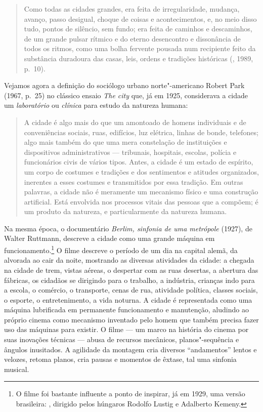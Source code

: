 \begin{quote}
Como todas as cidades grandes, era feita de irregularidade, mudança,
avanço, passo desigual, choque de coisas e acontecimentos, e, no meio
disso tudo, pontos de silêncio, sem fundo; era feita de caminhos e
descaminhos, de um grande pulsar rítmico e do eterno desencontro e
dissonância de todos os ritmos, como uma bolha fervente pousada num
recipiente feito da substância duradoura das casas, leis, ordens e
tradições históricas (, 1989, p.~10).
\end{quote}

Vejamos agora a definição do sociólogo urbano norte"-americano Robert
Park (1967, p.~25) no clássico ensaio \emph{The city} que, já em 1925,
considerava a cidade um \emph{laboratório} ou \emph{clínica} para estudo
da natureza humana:

\begin{quote}
A cidade é algo mais do que um amontoado de homens individuais e de
conveniências sociais, ruas, edifícios, luz elétrica, linhas de bonde,
telefones; algo mais também do que uma mera constelação de
instituições e dispositivos administrativos --- tribunais, hospitais,
escolas, polícia e funcionários civis de vários tipos. Antes, a cidade é
um estado de espírito, um corpo de costumes e tradições e dos
sentimentos e atitudes organizados, inerentes a esses costumes e
transmitidos por essa tradição. Em outras palavras, a cidade não é
meramente um mecanismo físico e uma construção artificial. Está
envolvida nos processos vitais das pessoas que a compõem; é um produto
da natureza, e particularmente da natureza humana.
\end{quote}

Na mesma época, o documentário \emph{Berlim, sinfonia de uma
metrópole} (1927), de Walter Ruttmann, descreve a cidade como uma grande
máquina em funcionamento.\footnote{O filme foi bastante influente a
  ponto de inspirar, já em 1929, uma versão brasileira: {}, dirigido pelos húngaros Rodolfo Lustig e
  Adalberto Kemeny.} O filme descreve o período de um dia na capital
alemã, da alvorada ao cair da noite, mostrando as diversas atividades da
cidade: a chegada na cidade de trem, vistas aéreas, o despertar com as
ruas desertas, a abertura das fábricas, os cidadãos se dirigindo para o
trabalho, a indústria, crianças indo para a escola, o comércio, o
transporte, cenas de rua, atividade política, classes sociais, o
esporte, o entretenimento, a vida noturna. A cidade é representada como
uma máquina lubrificada em permanente funcionamento e manutenção,
aludindo ao próprio cinema como mecanismo inventado pelo homem que
também precisa fazer uso das máquinas para existir. O filme --- um marco
na história do cinema por suas inovações técnicas --- abusa de recursos
mecânicos, planos"-sequência e ângulos inusitados. A agilidade da
montagem cria diversos ``andamentos'' lentos e velozes, retoma planos,
cria pausas e momentos de êxtase, tal uma sinfonia musical.

